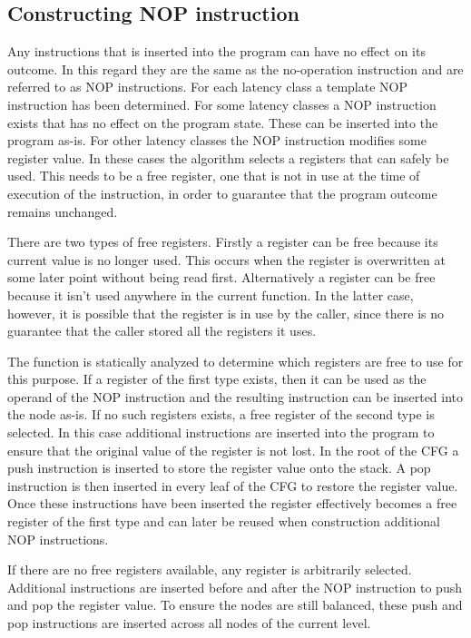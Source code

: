 \subsection{Constructing NOP instruction}
\label{sec:nop}
Any instructions that is inserted into the program can have no effect on its outcome. In this regard they are the same as the no-operation instruction and are 
referred to as NOP instructions. For each latency class a template NOP instruction has been determined. 
For some latency classes a NOP instruction exists that has no effect on the program state. These can be inserted into the program as-is. 
For other latency classes the NOP instruction modifies some register value. In these cases the algorithm selects a registers that can safely be used. 
This needs to be a free register, one that is not in use at the time of execution of the instruction, in order to guarantee that the program outcome remains unchanged.

There are two types of free registers. 
Firstly a register can be free because its current value is no longer used.
This occurs when the register is overwritten at some later point without being read first. 
Alternatively a register can be free because it isn't used anywhere in the current function. 
In the latter case, however, it is possible that the register is in use by the caller, since there is no guarantee that the caller stored all the registers it uses. 

The function is statically analyzed to determine which registers are free to use for this purpose. 
If a register of the first type exists, then it can be used as the operand of the NOP instruction and the resulting instruction 
can be inserted into the node as-is.
If no such registers exists, a free register of the second type is selected. 
In this case additional instructions are inserted into the program to ensure that the original value of the register is not lost. 
In the root of the CFG a push instruction is inserted to store the register value onto the stack. 
A pop instruction is then inserted in every leaf of the CFG to restore the register value. 
Once these instructions have been inserted the register effectively becomes a free register of the first type and can 
later be reused when construction additional NOP instructions.

If there are no free registers available, any register is arbitrarily selected. 
Additional instructions are inserted before and after the NOP instruction to push and pop the register value.
To ensure the nodes are still balanced, these push and pop instructions are inserted across all nodes of the current level. 

